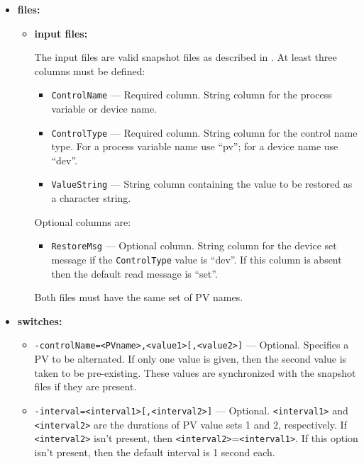 \begin{itemize}
\item {\bf files:}
\begin{itemize}
\item {\bf input files:}\par
The input files are valid snapshot files as described in . At least three
columns must be defined:
\begin{itemize}
        \item {\tt ControlName} --- Required column. String column for the process variable or device name.
        \item {\tt ControlType} --- Required column. String column for the control name type. For a 
                process variable name use ``pv''; for a device name use ``dev''.
        \item {\tt ValueString} --- String column containing the value to be restored as a character string.
\end{itemize}
Optional columns are:
\begin{itemize}
        \item {\tt RestoreMsg} --- Optional column. String column for the device set message if 
                the {\tt ControlType} value is ``dev''.
                If this column is absent then the default read message is ``set''.
\end{itemize}
        Both files must have the same set of PV names.
\end{itemize}
%
\item {\bf switches:}
%
%
    \begin{itemize}
%
%
        \item {\tt -controlName=<PVname>,<value1>[,<value2>]} --- Optional. Specifies a PV to be
                alternated. If only one value is given, then the second value
                is taken to be pre-existing. These values are synchronized with
                the snapshot files if they are present.
        \item {\tt -interval=<interval1>[,<interval2>]} ---  Optional. \verb+<interval1>+ and \verb+<interval2>+
                 are the durations of PV value sets 1 and 2, respectively.
                 If \verb+<interval2>+ isn't present, then \verb+<interval2>+=\verb+<interval1>+.
                 If this option isn't present, then the default interval is 1 second each.

\end{itemize}
\end{itemize}
